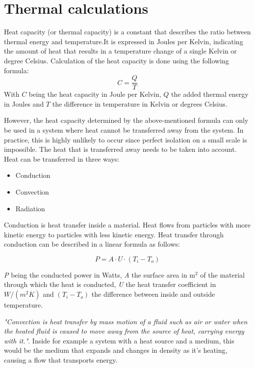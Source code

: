 \documentclass[12pt,a4paper,final]{report}
\begin{document}
\chapter{Thermal calculations}
Heat capacity (or thermal capacity) is a constant that describes the ratio between thermal energy and temperature.It is expressed in Joules per Kelvin, indicating the amount of heat that results in a temperature change of a single Kelvin or degree Celsius\cite{chemwiki14}. Calculation of the heat capacity is done using the following formula:
\begin{equation} \label{eq:ThermalCapacity}
C = \frac{Q}{T}
\end{equation}
With $C$ being the heat capacity in Joule per Kelvin, $Q$ the added thermal energy in Joules and $T$ the difference in temperature in Kelvin or degrees Celsius.

However, the heat capacity determined by the above-mentioned formula can only be used in a system where heat cannot be transferred away from the system. In practice, this is highly unlikely to occur since perfect isolation on a small scale is impossible. The heat that is transferred away needs to be taken into account. Heat can be transferred in three ways:
\begin{itemize}
	\item Conduction
	\item Convection
	\item Radiation
\end{itemize}
Conduction is heat transfer inside a material. Heat flows from particles with more kinetic energy to particles with less kinetic energy\cite{Hyperphysics98}. Heat transfer through conduction can be described in a linear formula as follows:

\begin{equation} \label{eq:HeatConduction}
P = A\cdot U\cdot (T_{i}-T_{o})
\end{equation}

\textit{P} being the conducted power in Watts, \textit{A} the surface area in $\mathrm{m^{2}}$ of the material through which the heat is conducted, \textit{U} the heat transfer coefficient in $W/(m^{2}K)$ and $(T_{i}-T_{o})$ the difference between inside and outside temperature\cite{thermopedia11}.

\textit{"Convection is heat transfer by mass motion of a fluid such as air or water when the heated fluid is caused to move away from the source of heat, carrying energy with it."}\cite{Hyperphysics98}. Inside for example a system with a heat source and a medium, this would be the medium that expands and changes in density as it's heating, causing a flow that transports energy.
\end{document}

